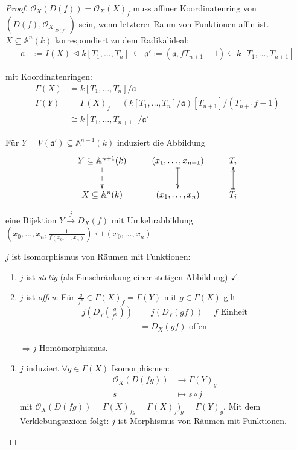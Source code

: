 \begin{proof}
  $\mathcal{O}_{X}(D(f))=\mathcal{O}_{X}(X)_{f}$ muss affiner
  Koordinatenring von $(D(f),\mathcal{O}_{X|_{D(f)}})$
  sein, wenn letzterer Raum von Funktionen affin ist. $X\subseteq\mathbb{A}^{n}(k)$
  korrespondiert zu dem Radikalideal:
  \begin{align*}
    \mathfrak{a} & :=I(X)\unlhd k[T_1, \ldots, T_n]\ \subseteq\ \mathfrak{a}':=(\mathfrak{a},fT_{n+1}-1)\subseteq k[T_{1},\ldots,T_{n+1}]
  \end{align*}

  mit Koordinatenringen:
  \begin{align*}
    \Gamma(X) & =k[T_{1},\ldots,T_{n}]/\mathfrak{a}\\
    \Gamma(Y) & =\Gamma(X)_{f}=(k[T_{1},\ldots,T_{n}]/\mathfrak{a})[T_{n+1}]/(T_{n+1}f-1)\\
              & \cong k[T_{1},\ldots,T_{n+1}]/\mathfrak{a}'
  \end{align*}

  Für $Y=V(\mathfrak{a}')\subseteq\mathbb{A}^{n+1}(k)$ induziert die
  Abbildung
  \[
    \xymatrix{Y\subseteq\mathbb{A}^{n+1}(k)\ar@{-->}[d] & (x_{1},\ldots,x_{n+1})\ar@{|->}[d] & T_{i}\\
      X\subseteq\mathbb{A}^{n}(k) & (x_{1},\ldots,x_{n}) & T_{i}\ar@{|->}[u]
    }
  \]

  eine Bijektion $Y\xrightarrow{j} D_{X}(f)$  mit Umkehrabbildung
  $(x_{0},\ldots,x_{n},\frac{1}{f(x_{0},\ldots,x_{n})})\mapsfrom(x_{0},\ldots,x_{n})$
  \begin{claim*}
    $j$ ist Isomorphismus von Räumen mit Funktionen:
    \begin{enumerate}
    \item $j$ ist \emph{stetig} (als Einschränkung einer stetigen Abbildung) $\checkmark$
    \item $j$ ist \emph{offen}: Für $\frac{g}{f^{n}}\in\Gamma(X)_{f} = \Gamma(Y)$ mit $g\in\Gamma(X)$ gilt
      \begin{align*}
        j\left(D_{Y}\left(\frac{g}{f^{n}}\right)\right) & =j\left(D_{Y}(gf)\right) & f\text{ Einheit}\\
                                                        & =D_{X}(gf)\text{ offen}
      \end{align*}

      $\Rightarrow j$ Homömorphismus.
    \item $j$ induziert $\forall g\in\Gamma(X)$ Isomorphismen:
      \begin{align*}
        \mathcal{O}_{X}(D(fg)) & \longrightarrow\Gamma(Y)_{g}\\
        s & \longmapsto s\circ j
      \end{align*}
      mit $\mathcal{O}_{X}(D(fg))=\Gamma(X)_{fg}=\Gamma(X)_{f})_{g}=\Gamma(Y)_{g}$.
      Mit dem Verklebungsaxiom folgt: $j$ ist Morphismus von Räumen mit Funktionen.
    \end{enumerate}
  \end{claim*}
\end{proof}
